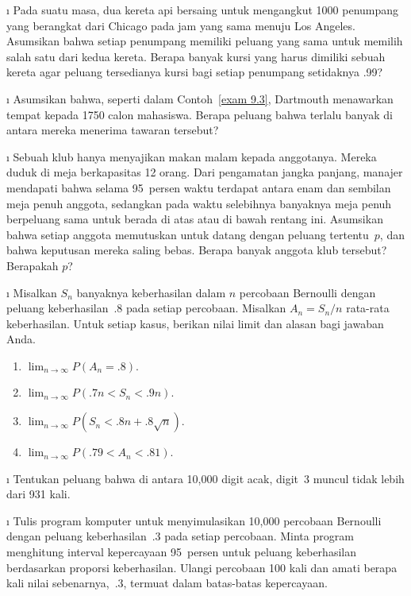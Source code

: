 \begin{LJSItem}
\i\label{exer 9.1.6}  Pada suatu masa, dua kereta api bersaing untuk mengangkut
1000 penumpang yang berangkat dari Chicago pada jam yang sama menuju
Los Angeles.  Asumsikan bahwa setiap penumpang memiliki peluang yang sama untuk memilih salah satu dari kedua
kereta.  Berapa banyak kursi yang harus dimiliki sebuah kereta agar peluang tersedianya kursi
bagi setiap penumpang setidaknya .99?

\i\label{exer 9.1.7}  Asumsikan bahwa, seperti dalam Contoh~\ref{exam 9.3}, Dartmouth menawarkan tempat kepada 1750
calon mahasiswa.  Berapa peluang bahwa terlalu banyak di antara mereka menerima tawaran tersebut?

\i\label{exer 9.1.8}  Sebuah klub hanya menyajikan makan malam kepada anggotanya.  Mereka duduk di meja berkapasitas
12 orang.  Dari pengamatan jangka panjang, manajer mendapati bahwa selama 95~persen
waktu terdapat antara enam dan sembilan meja penuh anggota, sedangkan pada waktu selebihnya
banyaknya meja penuh berpeluang sama untuk berada di atas atau di bawah rentang ini. 
Asumsikan bahwa setiap anggota memutuskan untuk datang dengan peluang tertentu~$p$, dan bahwa
keputusan mereka saling bebas.  Berapa banyak anggota klub tersebut?  Berapakah $p$?

\i\label{exer 9.1.9}  Misalkan $S_n$ banyaknya keberhasilan dalam $n$ percobaan Bernoulli dengan
peluang keberhasilan~.8 pada setiap percobaan.  Misalkan $A_n = S_n/n$ rata-rata keberhasilan. 
Untuk setiap kasus, berikan nilai limit dan alasan bagi jawaban Anda.
\begin{enumerate}
\item  $\lim_{n \to \infty} P(A_n = .8)$.

\item  $\lim_{n \to \infty} P(.7n < S_n < .9n)$.

\item  $\lim_{n \to \infty} P(S_n < .8n + .8\sqrt n)$.

\item  $\lim_{n \to \infty} P(.79 < A_n < .81)$.
\end{enumerate}

\i\label{exer 9.1.10}  Tentukan peluang bahwa di antara 10{,}000 digit acak, digit~3
muncul tidak lebih dari 931 kali.

\i\label{exer 9.1.11} Tulis program komputer untuk menyimulasikan 10{,}000
percobaan Bernoulli dengan peluang keberhasilan~.3 pada setiap percobaan.  Minta
program menghitung interval kepercayaan 95~persen untuk peluang
keberhasilan berdasarkan proporsi keberhasilan.  Ulangi percobaan 100 kali
dan amati berapa kali nilai sebenarnya,~.3, termuat dalam batas-batas
kepercayaan.


\end{LJSItem}
